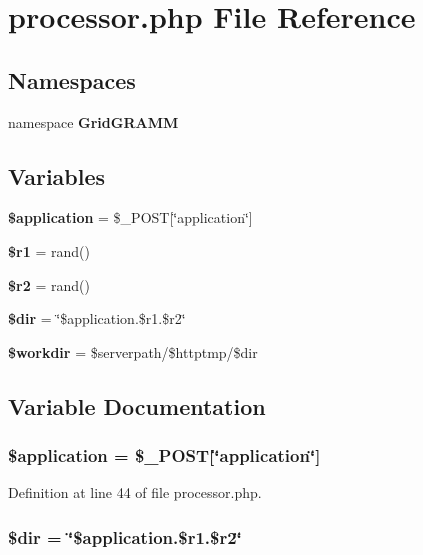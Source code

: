 \section{processor.php File Reference}
\label{processor_8php}
\subsection*{Namespaces}
\begin{CompactItemize}
\item 
namespace {\bf Grid\-GRAMM}
\end{CompactItemize}
\subsection*{Variables}
\begin{CompactItemize}
\item 
{\bf \$application} = \$\_\-POST[\char`\"{}application\char`\"{}]
\item 
{\bf \$r1} = rand()
\item 
{\bf \$r2} = rand()
\item 
{\bf \$dir} = \char`\"{}\$application.\$r1.\$r2\char`\"{}
\item 
{\bf \$workdir} = \$serverpath/\$httptmp/\$dir
\end{CompactItemize}


\subsection{Variable Documentation}
\subsubsection{\setlength{\rightskip}{0pt plus 5cm}\$application = \$\_\-POST[\char`\"{}application\char`\"{}]}\label{processor_8php_a0}




Definition at line 44 of file processor.php.
\subsubsection{\setlength{\rightskip}{0pt plus 5cm}\$dir = \char`\"{}\$application.\$r1.\$r2\char`\"{}}\label{processor_8php_a3}




